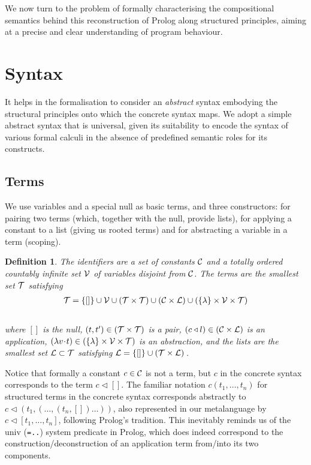 \documentclass{tlp}
\newtheorem{definition}[theorem]{Definition}
\def\LL{\mathcal L}
\def\nil{[]}\def\applsym{\triangleleft}
\def\appl#1#2{#1\applsym#2}
\def\abstsym{\!\cdot\!}
\def\abst#1#2{\lambda#1\abstsym#2}
\begin{document}
We now turn to the problem of formally characterising the
compositional semantics behind this reconstruction of Prolog along
structured principles, aiming at a precise and clear understanding of
program behaviour.

\section{Syntax}

It helps in the formalisation to consider an \emph{abstract} syntax embodying the
structural principles onto which the concrete syntax maps. We adopt a simple
abstract syntax that is universal, given its suitability to encode the syntax of
various formal calculi in the absence of predefined semantic roles for its
constructs.

\subsection{Terms}

  We use variables and a special null as basic terms, and three
constructors: for pairing two terms (which, together with the null, provide
lists), for applying a constant to a list (giving us rooted terms) and for
abstracting a variable in a term (scoping).

\begin{definition}
  The identifiers are a set of \emph{constants} ${\cal C}$ and a
  totally ordered countably infinite set ${\cal V}$ of \emph{variables} disjoint from
  ${\cal C}$.  The \emph{terms} are the smallest set ${\cal T}$
  satisfying\\[-13pt]
  \begin{eqnarray}
\T = \{\nil\}\cup \V\cup (\T\times \T)
\cup({\C}\times{\LL}) \cup(\{\lambda\}\times{\V}\times{\T})    
  \end{eqnarray}\\[-13pt]
where $\nil$ is the
\emph{null}, $(t,t')\in({\cal T}\times{\cal T})$ is a \emph{pair}, $(\appl
cl)\in({\C}\times{\LL})$ is an \emph{application}, $(\abst
vt)\in(\{\lambda\}\times{\V}\times{\T})$ is an \emph{abstraction}, and the
\emph{lists} are the smallest set $\LL\subset\T$
satisfying $\LL=\{\nil\}\cup(\T\times\LL)\,$.
\end{definition}

Notice that formally a constant $c\in{\cal C}$ is not a term, but $c$ in the
concrete syntax corresponds to the term $\appl c\nil$. The familiar
notation $c(t_1,\ldots,t_n)$ for structured
terms in the concrete syntax corresponds abstractly to $\appl
c{(t_1,(\ldots,(t_n,\nil)\ldots))}$, also represented in
our metalanguage by $\appl c{[t_1,\ldots,t_n]}$, following Prolog's
tradition. This inevitably reminds us of the \textsf{univ} ({\tt=..})
system predicate in Prolog, which does indeed
correspond to the construction/deconstruction of an application term
from/into its two components.
\end{document}
